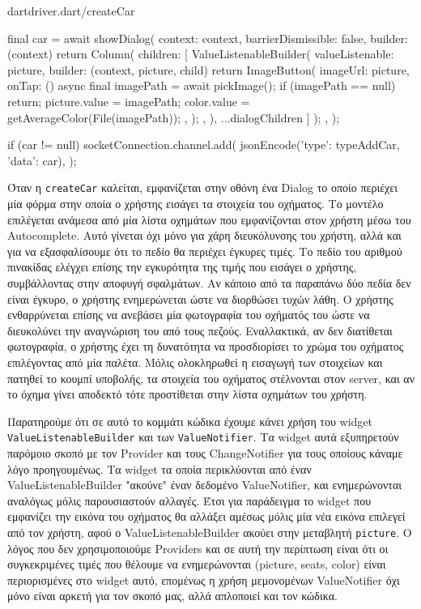 \documentclass[../thesis.tex]{subfiles}
\begin{document}
\begin{codeblock}{dart}{driver.dart/createCar}
{    final car = await showDialog(
      context: context,
      barrierDismissible: false,
      builder: (context) {
        return Column(
          children: [
            ValueListenableBuilder(
              valueListenable: picture,
              builder: (context, picture, child) {
                return ImageButton(
                  imageUrl: picture,
                  onTap: () async {
                    final imagePath = await pickImage();
                    if (imagePath == null) return;
                    picture.value = imagePath;
                    color.value = getAverageColor(File(imagePath));
                  },
                );
              },
            ),
          ...dialogChildren
          ]
        );
      },
    );

    if (car != null) {
      socketConnection.channel.add(
        jsonEncode({'type': typeAddCar, 'data': car}),
      );
    }
  }
\end{codeblock}

Όταν η \verb|createCar| καλείται, εμφανίζεται στην οθόνη ένα Dialog το οποίο περιέχει μία φόρμα στην οποία ο χρήστης εισάγει τα στοιχεία του οχήματος.
Το μοντέλο επιλέγεται ανάμεσα από μία λίστα οχημάτων που εμφανίζονται στον χρήστη μέσω του Autocomplete.
Αυτό γίνεται όχι μόνο για χάρη διευκόλυνσης του χρήστη, αλλά και για να εξασφαλίσουμε ότι το πεδίο θα περιέχει έγκυρες τιμές.
Το πεδίο του αριθμού πινακίδας ελέγχει επίσης την εγκυρότητα της τιμής που εισάγει ο χρήστης, συμβάλλοντας στην αποφυγή σφαλμάτων.
Αν κάποιο από τα παραπάνω δύο πεδία δεν είναι έγκυρο, ο χρήστης ενημερώνεται ώστε να διορθώσει τυχών λάθη.
Ο χρήστης ενθαρρύνεται επίσης να ανεβάσει μία φωτογραφία του οχήματός του ώστε να διευκολύνει την αναγνώριση του από τους πεζούς.
Εναλλακτικά, αν δεν διατίθεται φωτογραφία, ο χρήστης έχει τη δυνατότητα να προσδιορίσει το χρώμα του οχήματος επιλέγοντας από μία παλέτα.
Μόλις ολοκληρωθεί η εισαγωγή των στοιχείων και πατηθεί το κουμπί υποβολής, τα στοιχεία του οχήματος στέλνονται στον server, και αν το όχημα γίνει αποδεκτό τότε προστίθεται στην λίστα οχημάτων του χρήστη.

Παρατηρούμε ότι σε αυτό το κομμάτι κώδικα έχουμε κάνει χρήση του widget \texttt{ValueListenableBuilder} και των \verb|ValueNotifier|.
Τα widget αυτά εξυπηρετούν παρόμοιο σκοπό με τον Provider και τους ChangeNotifier για τους οποίους κάναμε λόγο προηγουμένως.
Τα widget τα οποία περικλύονται από έναν ValueListenableBuilder "ακούνε" έναν δεδομένο ValueNotifier, και ενημερώνονται αναλόγως μόλις παρουσιαστούν αλλαγές.
Έτσι για παράδειγμα το widget που εμφανίζει την εικόνα του οχήματος θα αλλάξει αμέσως μόλις μία νέα εικόνα επιλεγεί από τον χρήστη, αφού ο ValueListenableBuilder ακούει στην μεταβλητή \verb|picture|.
Ο λόγος που δεν χρησιμοποιούμε Providers και σε αυτή την περίπτωση είναι ότι οι συγκεκριμένες τιμές που θέλουμε να ενημερώνονται (picture, seats, color) είναι περιορισμένες στο widget αυτό, επομένως η χρήση μεμονομένων ValueNotifier όχι μόνο είναι αρκετή για τον σκοπό μας, αλλά απλοποιεί και τον κώδικα.
\end{document}
